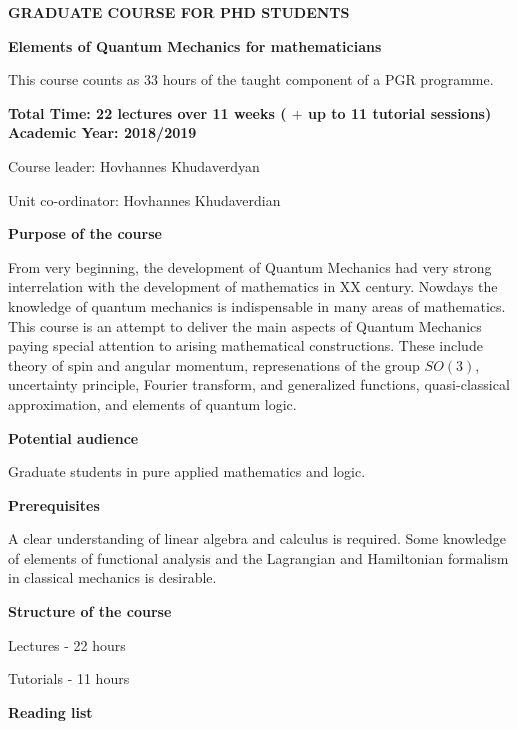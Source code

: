 \documentclass[12pt]{article}
\begin{document}
\centerline {\bf  GRADUATE COURSE FOR PHD STUDENTS}

\bigskip

\centerline 
{\bf Elements of Quantum Mechanics for mathematicians}

\smallskip

This course counts as 33 hours of the taught component 
of a PGR programme.

{\bf Total Time: 22 lectures over 11 weeks
 ( $+$ up to 11 tutorial sessions) Academic Year: 2018/2019

Course leader: Hovhannes Khudaverdyan



Unit co-ordinator: Hovhannes Khudaverdian  



}

\medskip

{\bf Purpose of the course}

 

From  very beginning, the development of
Quantum Mechanics  had very strong interrelation with the
development of mathematics in XX century. 
 Nowdays the knowledge of quantum mechanics
is indispensable in many areas of mathematics.
This course is an attempt to 
deliver the main aspects of  Quantum Mechanics
paying special attention
to   arising mathematical constructions. 
These include theory of spin and angular momentum,  
represenations of the group $SO(3)$, 
uncertainty principle, Fourier transform, 
and generalized functions, 
quasi-classical approximation, and elements of quantum logic.   

 
\medskip
 
{\bf Potential audience}

Graduate students in pure applied mathematics and logic.


\medskip


{\bf  Prerequisites}

A clear understanding of linear algebra 
and calculus is required. 
Some knowledge of elements of functional analysis
 and the Lagrangian and Hamiltonian formalism 
in classical mechanics
is desirable.

\bigskip

{\bf Structure of the course}


Lectures - 22 hours 

Tutorials - 11 hours 

\medskip

{\bf Reading list}
\end{document}
